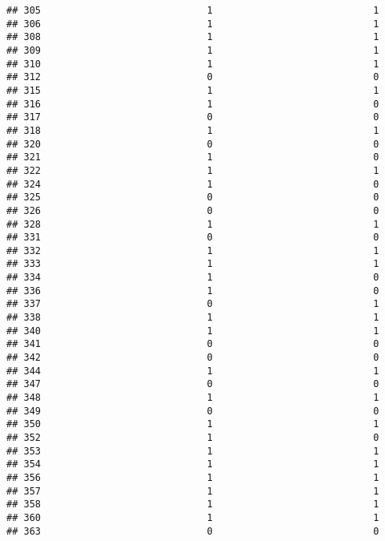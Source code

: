 \documentclass[
]{article}
\begin{document}
\begin{verbatim}
## 305                             1                            1
## 306                             1                            1
## 308                             1                            1
## 309                             1                            1
## 310                             1                            1
## 312                             0                            0
## 315                             1                            1
## 316                             1                            0
## 317                             0                            0
## 318                             1                            1
## 320                             0                            0
## 321                             1                            0
## 322                             1                            1
## 324                             1                            0
## 325                             0                            0
## 326                             0                            0
## 328                             1                            1
## 331                             0                            0
## 332                             1                            1
## 333                             1                            1
## 334                             1                            0
## 336                             1                            0
## 337                             0                            1
## 338                             1                            1
## 340                             1                            1
## 341                             0                            0
## 342                             0                            0
## 344                             1                            1
## 347                             0                            0
## 348                             1                            1
## 349                             0                            0
## 350                             1                            1
## 352                             1                            0
## 353                             1                            1
## 354                             1                            1
## 356                             1                            1
## 357                             1                            1
## 358                             1                            1
## 360                             1                            1
## 363                             0                            0

\end{verbatim}
\end{document}
